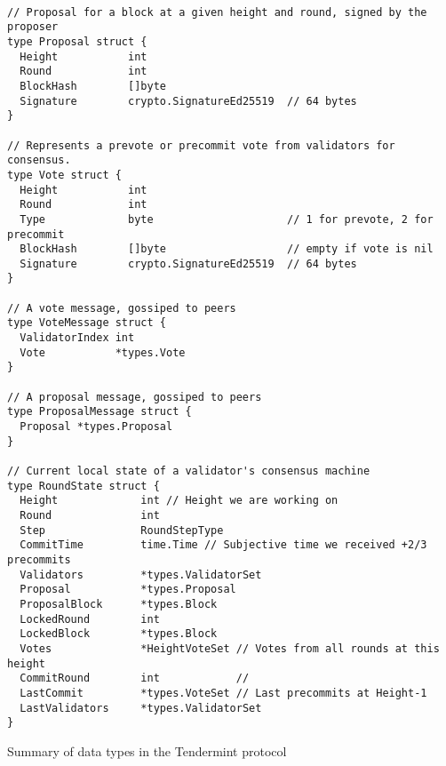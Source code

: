 
\vspace*{-1.5in}

\begin{lstlisting}

// Proposal for a block at a given height and round, signed by the proposer
type Proposal struct {
  Height           int                     
  Round            int                     
  BlockHash        []byte                  
  Signature        crypto.SignatureEd25519  // 64 bytes
}

// Represents a prevote or precommit vote from validators for consensus.
type Vote struct {
  Height           int                     
  Round            int                     
  Type             byte                     // 1 for prevote, 2 for precommit
  BlockHash        []byte                   // empty if vote is nil
  Signature        crypto.SignatureEd25519  // 64 bytes
}

// A vote message, gossiped to peers
type VoteMessage struct {
  ValidatorIndex int
  Vote           *types.Vote
}

// A proposal message, gossiped to peers
type ProposalMessage struct {
  Proposal *types.Proposal
}

// Current local state of a validator's consensus machine
type RoundState struct {
  Height             int // Height we are working on
  Round              int
  Step               RoundStepType
  CommitTime         time.Time // Subjective time we received +2/3 precommits 
  Validators         *types.ValidatorSet
  Proposal           *types.Proposal
  ProposalBlock      *types.Block
  LockedRound        int
  LockedBlock        *types.Block
  Votes              *HeightVoteSet // Votes from all rounds at this height
  CommitRound        int            //
  LastCommit         *types.VoteSet // Last precommits at Height-1
  LastValidators     *types.ValidatorSet
}
\end{lstlisting}

\caption[Summary of Tendermint protocol data types]{Summary of data types in the Tendermint protocol}
